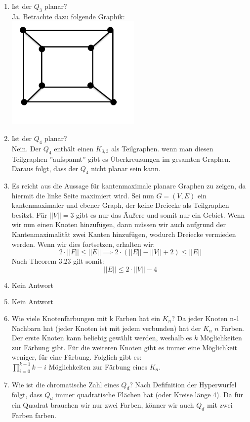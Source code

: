 \begin{enumerate}[label=(\alph*)]
        \item Ist der $Q_3$ planar? \\
        Ja. Betrachte dazu folgende Graphik:\\
        \includegraphics[width=0.3\linewidth]{Q3}
        
        \item Ist der $Q_4$ planar?\\
        Nein. Der $Q_4$ enthält einen $K_{3,3}$ als Teilgraphen. wenn man diesen Teilgraphen ''aufspannt'' 
        gibt es Überkreuzungen im gesamten Graphen. Daraus folgt, dass der $Q_4$ nicht planar sein kann.
        
        \item Es reicht aus die Aussage für kantenmaximale planare Graphen zu zeigen, da hiermit die 
        linke Seite maximiert wird. Sei nun $G=(V,E)$ ein kantenmaximaler und ebener Graph, der keine 
        Dreiecke als Teilgraphen besitzt. Für $||V||=3$ gibt es nur das Äußere und somit nur ein Gebiet. 
        Wenn wir nun einen Knoten hinzufügen, dann müssen wir auch aufgrund der Kantenmaximalität zwei 
        Kanten hinzufügen, wodurch Dreiecke vermieden werden.  Wenn wir dies fortsetzen, erhalten wir:
        $$ 2 \cdot ||F|| \le ||E||\implies 2 \cdot \left(||E|| - ||V|| + 2 \right) \le ||E||$$
        Nach Theorem 3.23 gilt somit:
        $$||E|| \le 2 \cdot ||V|| - 4 $$ 
        
        \item Kein Antwort
        
        \item Kein Antwort

        \item Wie viele Knotenfärbungen mit k Farben hat ein $K_n$?
        Da jeder Knoten n-1 Nachbarn hat (jeder Knoten ist mit jedem verbunden) hat der $K_n$ $n$ Farben. 
        Der erste Knoten kann beliebig gewählt werden, weshalb es $k$ Möglichkeiten zur Färbung gibt. 
        Für die weiteren Knoten gibt es immer eine Möglichkeit weniger, für eine Färbung. Folglich gibt es: \\
        $\prod_{i=0}^{k-1} k - i$ Möglichkeiten zur Färbung eines $K_n$.
          
        \item Wie ist die chromatische Zahl eines $Q_d$?
        Nach Defifnition der Hyperwurfel folgt, dass $Q_d$ immer quadratische Flächen hat (oder Kreise 
        länge 4). Da für ein Quadrat brauchen wir nur zwei Farben, könner wir auch $Q_d$ mit zwei Farben farben.
        
    \end{enumerate}
